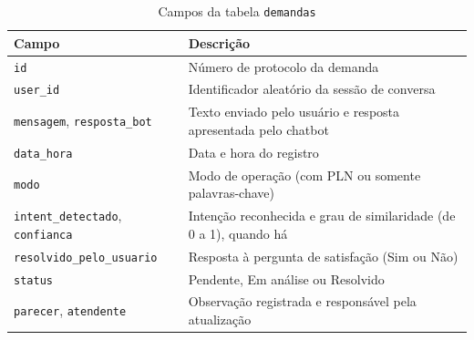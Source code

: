 \documentclass[10pt]{article}
\begin{document}
\begin{table}[H]
  \centering
  \begin{tabular}{|p{}|p{}|}
    \hline
    \textbf{Campo} & \textbf{Descrição} \\ \hline
    \texttt{id} & Número de protocolo da demanda \\ \hline
    \texttt{user\_id} & Identificador aleatório da sessão de conversa \\ \hline
    \texttt{mensagem}, \texttt{resposta\_bot} & Texto enviado pelo usuário e
    resposta apresentada pelo chatbot \\ \hline
    \texttt{data\_hora} & Data e hora do registro \\ \hline
    \texttt{modo} & Modo de operação (com PLN ou somente palavras-chave) \\ \hline
    \texttt{intent\_detectado}, \texttt{confianca} & Intenção reconhecida e
    grau de similaridade (de 0 a 1), quando há \\ \hline
    \texttt{resolvido\_pelo\_usuario} & Resposta à pergunta de satisfação (Sim
    ou Não) \\ \hline
    \texttt{status} & Pendente, Em análise ou Resolvido \\ \hline
    \texttt{parecer}, \texttt{atendente} & Observação registrada e responsável
    pela atualização \\ \hline
  \end{tabular}
  \caption{Campos da tabela \texttt{demandas}}
  \label{tab:demandas}
\end{table}
\end{document}

